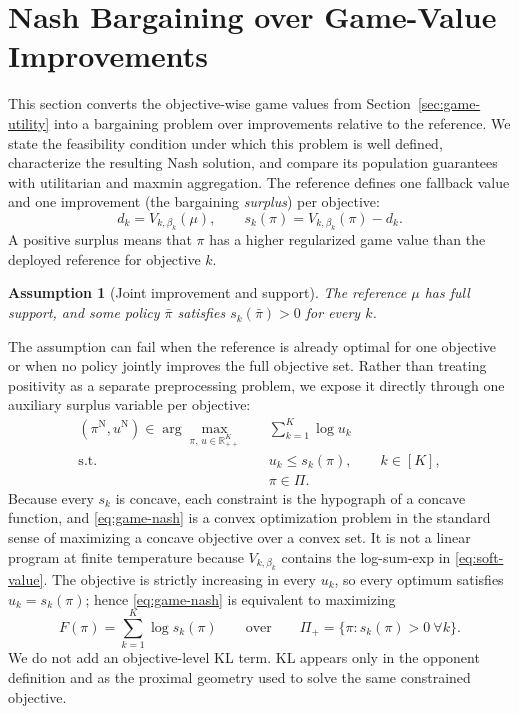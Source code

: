 \documentclass{article}
\newtheorem{assumption}{Assumption}
\theoremstyle{remark}
\theoremstyle{plain}
\newcommand{\R}{\mathbb{R}}
\begin{document}
\section{Nash Bargaining over Game-Value Improvements}
\label{sec:bargaining}
This section converts the objective-wise game values from
Section~\ref{sec:game-utility} into a bargaining problem over
improvements relative to the reference. We state the feasibility condition under which this problem is well defined, characterize the resulting Nash solution, and compare its population guarantees with utilitarian and maxmin aggregation.
The reference defines one fallback value and one improvement (the bargaining \emph{surplus}) per objective:
\begin{equation}
d_k=V_{k,\beta_k}(\mu),
\qquad
s_k(\pi)=V_{k,\beta_k}(\pi)-d_k.
\label{eq:game-surplus}
\end{equation}
A positive surplus means that $\pi$ has a higher regularized game value than the deployed reference for objective $k$.

\begin{assumption}[Joint improvement and support]
\label{ass:joint}
The reference $\mu$ has full support, and some policy $\bar\pi$ satisfies $s_k(\bar\pi)>0$ for every $k$.
\end{assumption}
The assumption can fail when the reference is already optimal for one objective or when no policy jointly improves the full objective set. Rather than treating positivity as a separate preprocessing problem, we expose it directly through one auxiliary surplus variable per objective:
\begin{equation}
\begin{aligned}
(\pi^{\mathrm N},u^{\mathrm N})\in
\arg\max_{\pi,\,u\in\R_{++}^K}
\quad&\sum_{k=1}^K\log u_k\\
\text{s.t.}\quad&u_k\le s_k(\pi),\qquad k\in[K],\\
&\pi\in\Pi.
\end{aligned}
\label{eq:game-nash}
\end{equation}
Because every $s_k$ is concave, each constraint is the hypograph of a concave function, and \eqref{eq:game-nash} is a convex optimization problem in the standard sense of maximizing a concave objective over a convex set. It is not a linear program at finite temperature because $V_{k,\beta_k}$ contains the log-sum-exp in \eqref{eq:soft-value}. The objective is strictly increasing in every $u_k$, so every optimum satisfies $u_k=s_k(\pi)$; hence \eqref{eq:game-nash} is equivalent to maximizing
\begin{equation}
F(\pi)=\sum_{k=1}^K\log s_k(\pi)
\qquad\text{over}\qquad
\Pi_+=\{\pi:s_k(\pi)>0\ \forall k\}.
\label{eq:nash-welfare}
\end{equation}
We do not add an objective-level KL term. KL appears only in the opponent definition and as the proximal geometry used to solve the same constrained objective.
\end{document}
